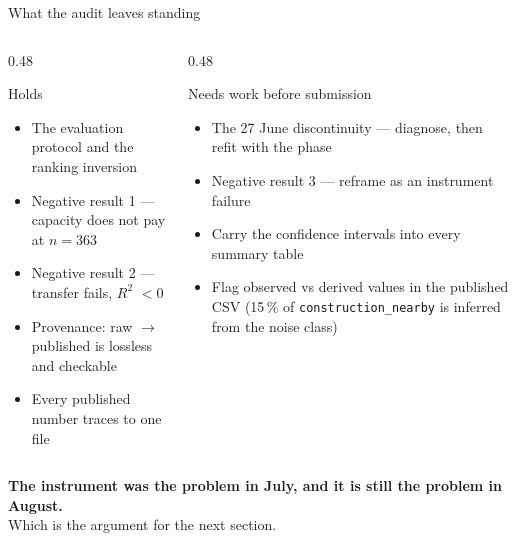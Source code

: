 \documentclass[aspectratio=169,10pt]{beamer}
\newcommand{\rr}{$R^2$}
\begin{document}

\begin{frame}{What the audit leaves standing}
  \begin{columns}[T]
    \begin{column}{0.48\textwidth}
      \begin{exampleblock}{Holds}
        \begin{itemize}
          \item The evaluation protocol and the ranking inversion
          \item Negative result 1 --- capacity does not pay at $n=363$
          \item Negative result 2 --- transfer fails, \rr{} $<0$
          \item Provenance: raw $\rightarrow$ published is lossless and checkable
          \item Every published number traces to one file
        \end{itemize}
      \end{exampleblock}
    \end{column}
    \begin{column}{0.48\textwidth}
      \begin{alertblock}{Needs work before submission}
        \begin{itemize}
          \item The 27 June discontinuity --- diagnose, then refit with the phase
          \item Negative result 3 --- reframe as an instrument failure
          \item Carry the confidence intervals into every summary table
          \item Flag observed vs derived values in the published CSV
                {\scriptsize (15\,\% of \texttt{construction\_nearby} is inferred
                from the noise class)}
        \end{itemize}
      \end{alertblock}
    \end{column}
  \end{columns}
  \vfill
  \begin{center}
    \small\textbf{The instrument was the problem in July, and it is still the
    problem in August.} \\
    {\color{muted}Which is the argument for the next section.}
  \end{center}
\end{frame}
\end{document}

